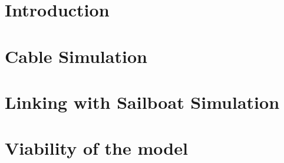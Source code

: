 \documentclass[twoside,12pt]{report} %
\begin{document}
\renewcommand{\contentsname}{Contents}	%
\renewcommand{\bibname}{Bibliography}	%




\tableofcontents  %

\chapter*{Introduction}

\chapter{Cable Simulation}


\chapter{Linking with Sailboat Simulation}


\chapter{Viability of the model}


%


\nocite{*}


\end{document}
